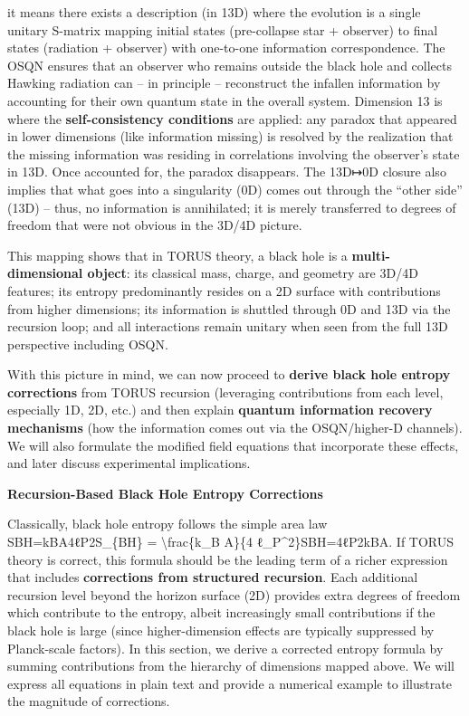 \documentclass[]{article}
\begin{document}
\begin{itemize}
  it means there exists a description (in 13D) where the evolution is a
  single unitary S-matrix mapping initial states (pre-collapse star +
  observer) to final states (radiation + observer) with one-to-one
  information correspondence. The OSQN ensures that an observer who
  remains outside the black hole and collects Hawking radiation can --
  in principle -- reconstruct the infallen information by accounting for
  their own quantum state in the overall system. Dimension 13 is where
  the \textbf{self-consistency conditions} are applied: any paradox that
  appeared in lower dimensions (like information missing) is resolved by
  the realization that the missing information was residing in
  correlations involving the observer's state in 13D. Once accounted
  for, the paradox disappears. The 13D↦0D closure also implies that what
  goes into a singularity (0D) comes out through the ``other side''
  (13D) -- thus, no information is annihilated; it is merely transferred
  to degrees of freedom that were not obvious in the 3D/4D picture.
\end{itemize}

This mapping shows that in TORUS theory, a black hole is a
\textbf{multi-dimensional object}: its classical mass, charge, and
geometry are 3D/4D features; its entropy predominantly resides on a 2D
surface with contributions from higher dimensions; its information is
shuttled through 0D and 13D via the recursion loop; and all interactions
remain unitary when seen from the full 13D perspective including OSQN.

With this picture in mind, we can now proceed to \textbf{derive black
hole entropy corrections} from TORUS recursion (leveraging contributions
from each level, especially 1D, 2D, etc.) and then explain
\textbf{quantum information recovery mechanisms} (how the information
comes out via the OSQN/higher-D channels). We will also formulate the
modified field equations that incorporate these effects, and later
discuss experimental implications.

\textbf{Recursion-Based Black Hole Entropy Corrections}

Classically, black hole entropy follows the simple area law
SBH=kBA4ℓP2S\_\{BH\} = \textbackslash{}frac\{k\_B A\}\{4
ℓ\_P\^{}2\}SBH​=4ℓP2​kB​A​. If TORUS theory is correct, this formula
should be the leading term of a richer expression that includes
\textbf{corrections from structured recursion}. Each additional
recursion level beyond the horizon surface (2D) provides extra degrees
of freedom which contribute to the entropy, albeit increasingly small
contributions if the black hole is large (since higher-dimension effects
are typically suppressed by Planck-scale factors). In this section, we
derive a corrected entropy formula by summing contributions from the
hierarchy of dimensions mapped above. We will express all equations in
plain text and provide a numerical example to illustrate the magnitude
of corrections.
\end{document}
